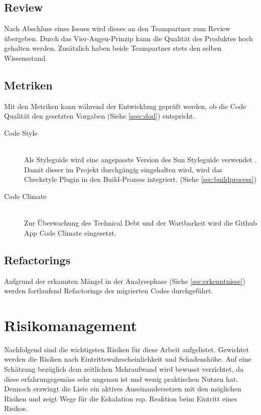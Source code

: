 \documentclass[11pt,a4paper,english,oneside]{book}
\numberwithin{equation}{chapter}
\begin{document}
	\subsection{Review}
	Nach Abschluss eines Issues wird dieses an den Teampartner zum Review übergeben. Durch das Vier-Augen-Prinzip kann die Qualität des Produktes hoch gehalten werden. Zusätzlich haben beide Teampartner stets den selben Wissensstand.
	
	\subsection{Metriken} \label{ssec:metriken}
	Mit den Metriken kann während der Entwicklung geprüft werden, ob die Code Qualität den gesetzten Vorgaben (Siehe \ref{ssec:dod}) entspricht.
	
	\begin{description}
		\item[Code Style] \hfill \\
		Als Styleguide wird eine angepasste Version des Sun Styleguide verwendet \cite{suncheckstyle}. Damit dieser im Projekt durchgängig eingehalten wird, wird das Checkstyle Plugin \cite{checkstyle} in den Build-Prozess integriert. (Siehe \ref{sec:buildprocess})
		\item[Code Climate] \hfill \\
		Zur Überwachung des Technical Debt und der Wartbarkeit wird die Github App Code Climate \cite{codeclimate} eingesetzt.	
	\end{description}
	
	\subsection{Refactorings}
	Aufgrund der erkannten Mängel in der Analysephase (Siehe \ref{sec:erkenntnisse}) werden fortlaufend Refactorings des migrierten Codes durchgeführt.
	
	
	
	
	\section{Risikomanagement}
	Nachfolgend sind die wichtigsten Risiken für diese Arbeit aufgelistet. Gewichtet werden die Risiken nach Eintrittswahrscheinlichkeit und Schadenshöhe. \cite{risikomanagement} Auf eine Schätzung bezüglich dem zeitlichen Mehraufwand wird bewusst verzichtet, da diese erfahrungsgemäss sehr ungenau ist und wenig praktischen Nutzen hat. Dennoch erzwingt die Liste ein aktives Auseinandersetzen mit den möglichen Risiken und zeigt Wege für die Eskalation rsp. Reaktion beim Eintritt eines Risikos.
	
\end{document}
